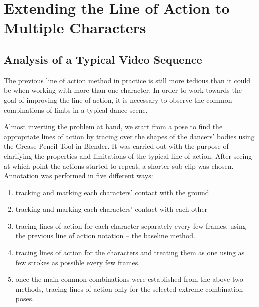 \chapter{Extending the Line of Action to Multiple Characters}\label{chap:implementation}

\section{Analysis of a Typical Video Sequence}
The previous line of action method in practice is still more tedious than it could be when working with more than one character. In order to work towards the goal of improving the line of action, it is necessary to observe the common combinations of limbs in a typical dance scene.

Almost inverting the problem at hand, we start from a pose to find the appropriate lines of action by tracing over the shapes of the dancers' bodies using the Grease Pencil Tool in Blender. It was carried out with the purpose of clarifying the properties and limitations of the typical line of action. After seeing at which point the actions started to repeat, a shorter sub-clip was chosen. Annotation was performed in five different ways:
\begin{enumerate}
	\item tracking and marking each characters' contact with the ground
	\item tracking and marking each characters' contact with each other
	\item tracing lines of action for each character separately every few frames, using the previous line of action notation -- the baseline method.
	\item tracing lines of action for the characters and treating them as one using as few strokes as possible every few frames.
	\item once the main common combinations were established from the above two methods, tracing lines of action only for the selected extreme combination poses.
\end{enumerate}

